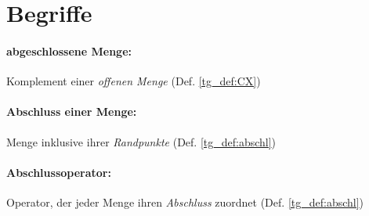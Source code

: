% 
% 
% 
% 
% 
% 


\section*{Begriffe}

    \paragraph{abgeschlossene Menge:} Komplement einer \textit{offenen Menge} (Def. \ref{tg_def:CX})

    \paragraph{Abschluss einer Menge:} Menge inklusive ihrer \textit{Randpunkte} (Def. \ref{tg_def:abschl})

    \paragraph{Abschlussoperator:} Operator, der jeder Menge ihren \textit{Abschluss} zuordnet (Def. \ref{tg_def:abschl})
    
